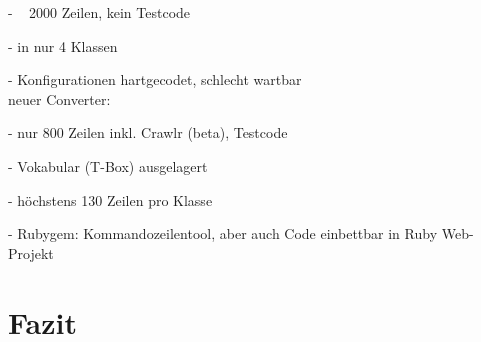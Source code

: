 \documentclass[runningheads,a4paper]{llncs}
\begin{document}
- ~ 2000 Zeilen, kein Testcode

- in nur 4 Klassen

- Konfigurationen hartgecodet, schlecht wartbar
\\
neuer Converter:

- nur 800 Zeilen inkl. Crawlr (beta), Testcode

- Vokabular (T-Box) ausgelagert

- höchstens 130 Zeilen pro Klasse

- Rubygem: Kommandozeilentool, aber auch Code einbettbar in Ruby Web-Projekt

\section{Fazit}

\nocite{url_dl_primer}



\end{document}

